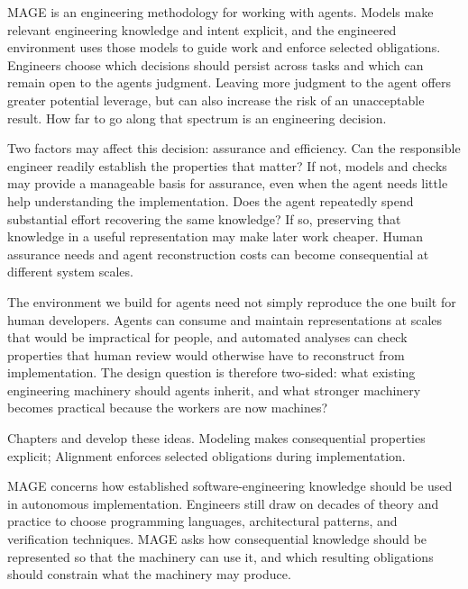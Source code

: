 MAGE is an engineering methodology for working with agents. Models make relevant engineering knowledge and intent explicit, and the engineered environment uses those models to guide work and enforce selected obligations. Engineers choose which decisions should persist across tasks and which can remain open to the agent\textquotesingle s judgment. Leaving more judgment to the agent offers greater potential leverage, but can also increase the risk of an unacceptable result. How far to go along that spectrum is an engineering decision.

Two factors may affect this decision: assurance and efficiency. Can the responsible engineer readily establish the properties that matter? If not, models and checks may provide a manageable basis for assurance, even when the agent needs little help understanding the implementation. Does the agent repeatedly spend substantial effort recovering the same knowledge? If so, preserving that knowledge in a useful representation may make later work cheaper. Human assurance needs and agent reconstruction costs can become consequential at different system scales.

The environment we build for agents need not simply reproduce the one built for human developers. Agents can consume and maintain representations at scales that would be impractical for people, and automated analyses can check properties that human review would otherwise have to reconstruct from implementation. The design question is therefore two-sided: what existing engineering machinery should agents inherit, and what stronger machinery becomes practical because the workers are now machines?


Chapters  and  develop these ideas. Modeling makes consequential properties explicit; Alignment enforces selected obligations during implementation.

MAGE concerns how established software-engineering knowledge should be used in autonomous implementation. Engineers still draw on decades of theory and practice to choose programming languages, architectural patterns, and verification techniques. MAGE asks how consequential knowledge should be represented so that the machinery can use it, and which resulting obligations should constrain what the machinery may produce.

